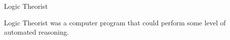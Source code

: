 %
%
%

\begin{frame}[t]{Logic Theorist} 

Logic Theorist was a computer program that could perform 
some level of automated reasoning. \cite{Newell:1956logth}
    
\end{frame}